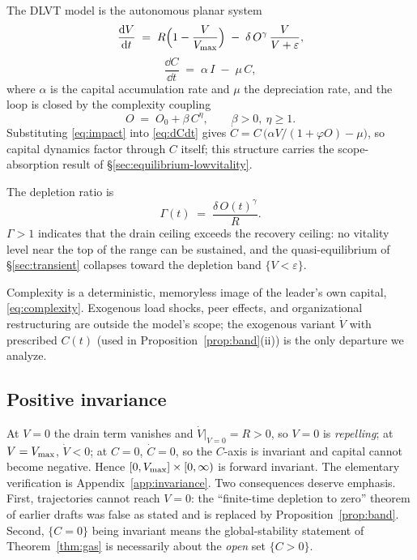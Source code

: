 The DLVT model is the autonomous planar system
\begin{equation}
\label{eq:dVdt}
\frac{\mathrm{d} V}{\mathrm{d} t}
 \;=\; R\Bigl(1-\frac{V}{V_{\max}}\Bigr)
 \;-\; \delta\,O^{\gamma}\,\frac{V}{V+\varepsilon},
\end{equation}
\begin{equation}
\label{eq:dCdt}
\frac{\dd C}{\dd t} \;=\; \alpha\,I \;-\; \mu\,C,
\end{equation}
where $\alpha$ is the capital accumulation rate and $\mu$ the depreciation
rate, and the loop is closed by the complexity coupling
\begin{equation}
\label{eq:complexity}
O \;=\; O_0 + \beta\,C^{\eta},
\qquad \beta>0,\ \eta\ge 1 .
\end{equation}
Substituting \eqref{eq:impact} into \eqref{eq:dCdt} gives
$\dot C = C\,\bigl(\alpha V/(1+\varphi O)-\mu\bigr)$, so capital dynamics
factor through $C$ itself; this structure carries the scope-absorption result
of \S\ref{sec:equilibrium-lowvitality}.

\begin{definition}
\label{def:depletion}
The depletion ratio is
\begin{equation}
\label{eq:gamma-ratio}
\Gamma(t) \;=\; \frac{\delta\,O(t)^{\gamma}}{R}.
\end{equation}
$\Gamma>1$ indicates that the drain ceiling exceeds the recovery ceiling: no
vitality level near the top of the range can be sustained, and the
quasi-equilibrium of \S\ref{sec:transient} collapses toward the depletion
band $\{V<\varepsilon\}$.
\end{definition}

\begin{assumption}
\label{ass:scope}
Complexity is a deterministic, memoryless image of the leader's own capital,
\eqref{eq:complexity}. Exogenous load shocks, peer effects, and
organizational restructuring are outside the model's scope; the exogenous
variant $\dot V$ with prescribed $C(t)$ (used in
Proposition~\ref{prop:band}(ii)) is the only departure we analyze.
\end{assumption}

\subsection{Positive invariance}
\label{sec:invariance}

At $V=0$ the drain term vanishes and $\dot V|_{V=0}=R>0$, so $V=0$ is
\emph{repelling}; at $V=V_{\max}$, $\dot V<0$; at $C=0$, $\dot C=0$, so the
$C$-axis is invariant and capital cannot become negative. Hence
$[0,V_{\max}]\times[0,\infty)$ is forward invariant. The elementary verification
is Appendix~\ref{app:invariance}. Two consequences deserve emphasis. First,
trajectories cannot reach $V=0$: the ``finite-time depletion to zero''
theorem of earlier drafts was false as stated and is replaced by
Proposition~\ref{prop:band}. Second, $\{C=0\}$ being invariant means the
global-stability statement of Theorem~\ref{thm:gas} is necessarily about the
\emph{open} set $\{C>0\}$.

